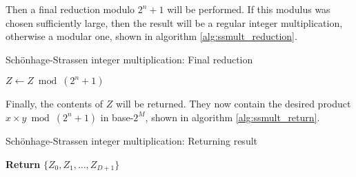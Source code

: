 Then a final reduction modulo $2^{n} + 1$ will be performed. If this modulus
was chosen sufficiently large, then the result will be a regular integer
multiplication, otherwise a modular one, shown in algorithm
\ref{alg:ssmult_reduction}.

\begin{algorithm}
		\caption{Schönhage-Strassen integer multiplication: Final reduction}
		\begin{algorithmic}[1]
				\State $Z \gets Z \bmod (2^n + 1)$
		\end{algorithmic}
		\label{alg:ssmult_reduction}
\end{algorithm}

Finally, the contents of $Z$ will be returned. They now contain the desired
product $x \times y \bmod (2^n + 1)$ in base-$2^M$, shown in algorithm
\ref{alg:ssmult_return}.

\begin{algorithm}
		\caption{Schönhage-Strassen integer multiplication: Returning result}
		\begin{algorithmic}[1]
				\State \textbf{Return} $\{Z_0, Z_1, \ldots, Z_{D+1}\}$
				\EndFunction
		\end{algorithmic}
		\label{alg:ssmult_return}
\end{algorithm}


